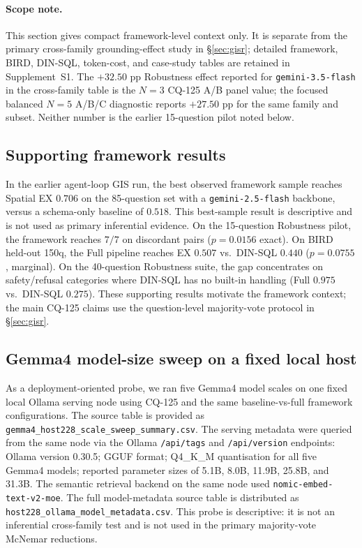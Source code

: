 
\paragraph{Scope note.} This section gives compact framework-level context only. It is separate from the primary cross-family grounding-effect study in \S\ref{sec:gisr}; detailed framework, BIRD, DIN-SQL, token-cost, and case-study tables are retained in Supplement~S1. The $+32.50$ pp Robustness effect reported for \texttt{gemini-3.5-flash} in the cross-family table is the $N{=}3$ CQ-125 A/B panel value; the focused balanced $N{=}5$ A/B/C diagnostic reports $+27.50$ pp for the same family and subset. Neither number is the earlier 15-question pilot noted below.

\subsection{Supporting framework results}
\label{sec:gis-results}

In the earlier agent-loop GIS run, the best observed framework sample reaches Spatial EX $0.706$ on the 85-question set with a \texttt{gemini-2.5-flash} backbone, versus a schema-only baseline of $0.518$. This best-sample result is descriptive and is not used as primary inferential evidence. On the 15-question Robustness pilot, the framework reaches $7/7$ on discordant pairs ($p=0.0156$ exact). On BIRD held-out 150q, the Full pipeline reaches EX $0.507$ vs.\ DIN-SQL $0.440$ ($p=0.0755$, marginal). On the 40-question Robustness suite, the gap concentrates on safety/refusal categories where DIN-SQL has no built-in handling (Full $0.975$ vs.\ DIN-SQL $0.275$). These supporting results motivate the framework context; the main CQ-125 claims use the question-level majority-vote protocol in \S\ref{sec:gisr}.

\subsection{Gemma4 model-size sweep on a fixed local host}
\label{sec:gemma4-scale-sweep}

As a deployment-oriented probe, we ran five Gemma4 model scales on one fixed local Ollama serving node using CQ-125 and the same baseline-vs-full framework configurations. The source table is provided as \texttt{gemma4\_host228\_scale\_sweep\_summary.csv}. The serving metadata were queried from the same node via the Ollama \texttt{/api/tags} and \texttt{/api/version} endpoints: Ollama version 0.30.5; GGUF format; Q4\_K\_M quantisation for all five Gemma4 models; reported parameter sizes of 5.1B, 8.0B, 11.9B, 25.8B, and 31.3B. The semantic retrieval backend on the same node used \texttt{nomic-embed-text-v2-moe}. The full model-metadata source table is distributed as \texttt{host228\_ollama\_model\_metadata.csv}. This probe is descriptive: it is not an inferential cross-family test and is not used in the primary majority-vote McNemar reductions.

